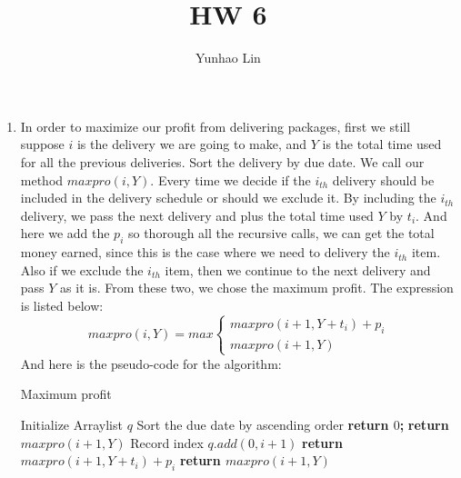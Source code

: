\documentclass[14pt]{article}
\title{HW 6}
\author{Yunhao Lin}
\begin{document}
\maketitle
\begin{enumerate}
    \item In order to maximize our profit from delivering packages, first we still
    suppose $i$ is the delivery we are going to make, and $Y$ is the total time 
    used for all the previous deliveries. Sort the delivery by due date. We call our method $maxpro(i, Y)$. Every time
    we decide if the $i_{th}$ delivery should be included in the delivery schedule
    or should we exclude it. By including the $i_{th}$ delivery, we pass the next
    delivery and plus the total time used $Y$ by $t_i$. And here we add the $p_i$
    so thorough all the recursive calls, we can get the total money earned, since
    this is the case where we need to delivery the $i_{th}$ item. Also if we exclude
    the $i_{th} $ item, then we continue to the next delivery and pass $Y$ as it 
    is. From these two, we chose the maximum profit. The expression is listed below:
    \[
    maxpro(i, Y) = max\left\{
                \begin{array}{ll}
                  maxpro(i+1, Y+t_i) + p_i\\
                  maxpro(i+1, Y)
                \end{array}
              \right.
    \]
    And here is the pseudo-code for the algorithm:\\
    \begin{minipage}{\linewidth}
        \begin{algorithm}[H]
          \caption{Maximum profit}
          \begin{algorithmic}[1]
            \State Initialize Arraylist $q$ 
            \State Sort the due date by ascending order
                  \State \textbf{return $0$;}
                \Else
                  \State \textbf{return} $maxpro(i+1, Y)$
                  \State Record index $q.add(0,i+1)$  
                  \State \textbf{return} $maxpro(i+1, Y+t_i) + p_i$
                \Else
                  \State \textbf{return $maxpro(i+1, Y)$}
                \EndIf
            \EndIf
            \EndProcedure 
          \end{algorithmic}
        \end{algorithm}
    \end{minipage}\\\\
    

\end{enumerate}
\end{document}
